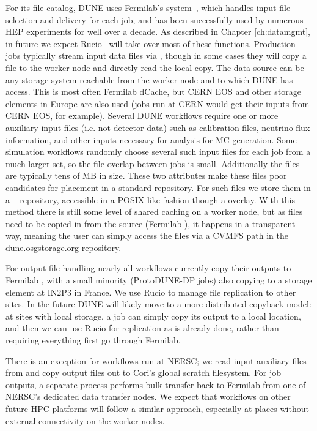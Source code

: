 \documentclass[../main-v1.tex]{subfiles}
\begin{document}
For its file catalog, DUNE uses Fermilab's  system~\cite{Illingworth:2014mba}, which handles input file selection and delivery for each job, and has been successfully used by numerous HEP experiments for well over a decade. As described in Chapter \ref{ch:datamgmt},  in future we expect Rucio~\cite{Barisits:2019fyl} will  take over most of these functions. Production jobs typically stream input data files via , though in some cases they will copy a file to the worker node and directly read the local copy. The data source can be any storage system reachable from the worker
node and to which DUNE has access. This is most often Fermilab dCache, but CERN EOS and other storage elements in Europe are also used (jobs run at CERN would get their inputs from CERN EOS, for example). Several DUNE workflows require one or more auxiliary input files (i.e. not detector data) such as calibration files, neutrino flux information, and other inputs necessary for analysis for MC generation. Some simulation workflows randomly
choose several such input files for each job from a much larger set, so the file overlap between jobs is small. Additionally the files are typically tens of MB in size. These two attributes make these files poor candidates for placement in a standard  repository. For such files we store them in a ~\cite{bib:stashcache} repository,
accessible in a POSIX-like fashion though a  overlay. With this method there is still some level of shared caching on a worker node, but as files need to be copied in from the source (Fermilab ), it happens in a transparent way, meaning the user can simply access the files via a CVMFS path in the dune.osgstorage.org repository.

For output file handling nearly all workflows currently copy their outputs to Fermilab , with a small minority (ProtoDUNE-DP jobs) also copying to a storage element at IN2P3 in France. We use Rucio to manage file replication
to other sites. In the future DUNE will likely move to a more distributed copyback model: at sites with local storage, a job can simply copy its output to a local location, and then we can use Rucio for replication as is already done, rather than requiring everything first go through Fermilab.

There is an exception for workflows run at NERSC; we read input auxiliary files from and copy output files out
to Cori's global scratch filesystem. For job outputs, a separate process performs bulk transfer back to Fermilab from one of NERSC's dedicated data transfer nodes. We expect that workflows on other future HPC platforms
will follow a similar approach, especially at places without external connectivity on the worker nodes.
\end{document}
